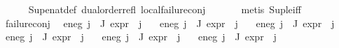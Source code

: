 \begin{isabellebody}
\ \ \ \ \isamarkupfalse%
\ Sup{\isacharunderscore}{\kern0pt}enat{\isacharunderscore}{\kern0pt}def\ dual{\isacharunderscore}{\kern0pt}order{\isachardot}{\kern0pt}refl\ local{\isachardot}{\kern0pt}failure{\isacharunderscore}{\kern0pt}conj\ \isanewline
\ \ \ \ \isamarkupfalse%
\ {\isacharparenleft}{\kern0pt}metis\ Sup{\isacharunderscore}{\kern0pt}le{\isacharunderscore}{\kern0pt}iff{\isacharparenright}{\kern0pt}{\isacharplus}{\kern0pt}\isanewline
\isanewline
\ \ \isamarkupfalse%
\ failure{\isacharunderscore}{\kern0pt}conj\ \isamarkupfalse%
\ e{}{\isacharunderscore}{\kern0pt}neg{\isacharcolon}{\kern0pt}\ {\isachardoublequoteopen}{\isasymforall}j\ {\isasymin}\ J{\isachardot}{\kern0pt}\ expr{\isacharunderscore}{\kern0pt}{}\ {\isacharparenleft}{\kern0pt}{\isasymPhi}\ j{\isacharparenright}{\kern0pt}\ {\isasymle}\ {}{\isachardoublequoteclose}\isanewline
{}\ e{}{\isacharunderscore}{\kern0pt}neg{\isacharcolon}{\kern0pt}\ {\isachardoublequoteopen}{\isasymforall}j\ {\isasymin}\ J{\isachardot}{\kern0pt}\ expr{\isacharunderscore}{\kern0pt}{}\ {\isacharparenleft}{\kern0pt}{\isasymPhi}\ j{\isacharparenright}{\kern0pt}\ {\isacharequal}{\kern0pt}\ {}{\isachardoublequoteclose}\isanewline
{}\ e{}{\isacharunderscore}{\kern0pt}neg{\isacharcolon}{\kern0pt}\ {\isachardoublequoteopen}{\isasymforall}j\ {\isasymin}\ J{\isachardot}{\kern0pt}\ expr{\isacharunderscore}{\kern0pt}{}\ {\isacharparenleft}{\kern0pt}{\isasymPhi}\ j{\isacharparenright}{\kern0pt}\ {\isacharequal}{\kern0pt}\ {}{\isachardoublequoteclose}\isanewline
{}\ e{}{\isacharunderscore}{\kern0pt}neg{\isacharcolon}{\kern0pt}\ {\isachardoublequoteopen}{\isasymforall}j\ {\isasymin}\ J{\isachardot}{\kern0pt}\ expr{\isacharunderscore}{\kern0pt}{}\ {\isacharparenleft}{\kern0pt}{\isasymPhi}\ j{\isacharparenright}{\kern0pt}\ {\isacharequal}{\kern0pt}\ {}{\isachardoublequoteclose}\isanewline
{}\ e{}{\isacharunderscore}{\kern0pt}neg{\isacharcolon}{\kern0pt}\ {\isachardoublequoteopen}{\isasymforall}j\ {\isasymin}\ J{\isachardot}{\kern0pt}\ expr{\isacharunderscore}{\kern0pt}{}\ {\isacharparenleft}{\kern0pt}{\isasymPhi}\ j{\isacharparenright}{\kern0pt}\ {\isacharequal}{\kern0pt}\ {}{\isachardoublequoteclose}\isanewline
{}\ e{}{\isacharunderscore}{\kern0pt}neg{\isacharcolon}{\kern0pt}\ {\isachardoublequoteopen}{\isasymforall}j\ {\isasymin}\ J{\isachardot}{\kern0pt}\ expr{\isacharunderscore}{\kern0pt}{}\ {\isacharparenleft}{\kern0pt}{\isasymPhi}\ j{\isacharparenright}{\kern0pt}\ {\isacharequal}{\kern0pt}\ {}{\isachardoublequoteclose}\isanewline

\end{isabellebody}
